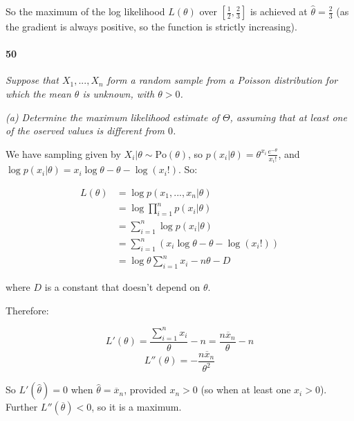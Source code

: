 \documentclass[a4paper]{article}
\begin{document}
                So the maximum of the log likelihood $L(\theta)$ over
                $\left[\frac{1}{2}, \frac{2}{3}\right]$ is achieved at $\widehat
                \theta = \frac{2}{3}$ (as the gradient is always positive, so
                the function is strictly increasing).

            \paragraph{50}
            \textit{Suppose that $X_1, ..., X_n$ form a random sample from a
            Poisson distribution for which the mean $\theta$ is unknown, with
            $\theta > 0$.}

            \textit{(a) Determine the maximum likelihood estimate of $\Theta$,
            assuming that at least one of the oserved values is different from
            $0$.}

                We have sampling given by $X_i | \theta \sim \text{Po}(\theta)$,
                so $p(x_i | \theta) = \theta^{x_i} \frac{e^{-\theta}}{x_i!}$,
                and $\log{p}(x_i | \theta) = x_i\log{\theta}- \theta -
                \log(x_i!)$. So:

                \begin{align*}
                    L(\theta) & = \log p(x_1, ..., x_n | \theta) \\
                    & = \log\prod_{i=1}^n p(x_i | \theta) \\
                    & = \sum_{i=1}^n \log p(x_i | \theta) \\
                    & = \sum_{i=1}^n (x_i\log\theta - \theta - \log(x_i!)) \\
                    & = \log\theta \sum_{i=1}^n x_i - n\theta - D
                \end{align*}

                where $D$ is a constant that doesn't depend on $\theta$.

                Therefore:

                \[
                    L'(\theta) = \frac{\sum\limits_{i=1}^n x_i}{\theta} - n =
                    \frac{n\overline x_n}{\theta} - n
                \]
                \[
                    L''(\theta) = -\frac{n\overline x_n}{\theta^2}
                \]

                So $L'(\widehat \theta) = 0$ when $\widehat \theta = \overline
                x_n$, provided $x_n > 0$ (so when at least one $x_i > 0$).
                Further $L''(\overline \theta) < 0$, so it is a maximum.
\end{document}
